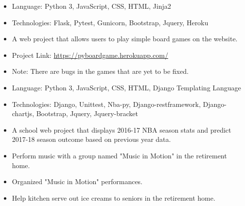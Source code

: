 \documentclass[10pt,a4paper]{altacv}
\begin{document}
\begin{itemize}
    \item Language: Python 3, JavaScript, CSS, HTML, Jinja2
    \item Technologies: Flask, Pytest, Gunicorn, Bootstrap, Jquery, Heroku
    \item A web project that allows users to play simple board games on the website.
    \item Project Link: \href{https://pyboardgame.herokuapp.com/}{https://pyboardgame.herokuapp.com/}
    \item Note: There are bugs in the games that are yet to be fixed.
\end{itemize}

\divider

\begin{itemize}
    \item Language: Python 3, JavaScript, CSS, HTML, Django Templating Language
    \item Technologies: Django, Unittest, Nba-py, Django-restframework, Django-chartjs, Bootstrap, Jquery, Jquery-bracket
    \item A school web project that displays 2016-17 NBA season stats and predict 2017-18 season outcome based on previous year data.
\end{itemize}



\begin{itemize}
    \item Perform music with a group named "Music in Motion" in the retirement home.
    \item Organized "Music in Motion" performances.
    \item Help kitchen serve out ice creams to seniors in the retirement home.
\end{itemize}
\end{document}
